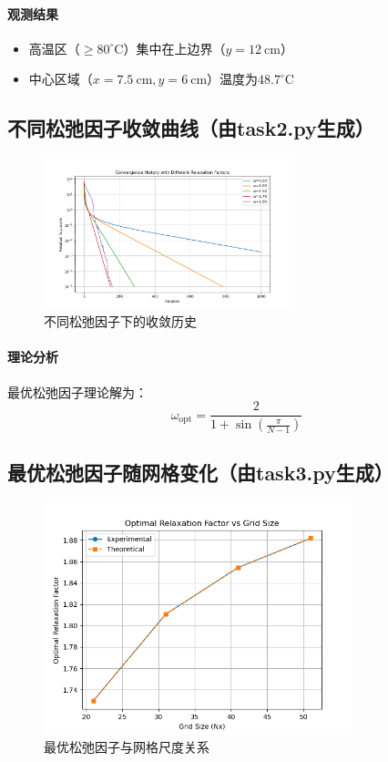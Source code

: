 \documentclass[UTF8]{ctexart}
\begin{document}
\paragraph{观测结果}
\begin{itemize}[leftmargin=2em]
    \item 高温区（$\geq80^\circ$C）集中在上边界（$y=12\ \mathrm{cm}$）
    \item 中心区域（$x=7.5\ \mathrm{cm}, y=6\ \mathrm{cm}$）温度为$48.7^\circ$C
\end{itemize}

\subsection{不同松弛因子收敛曲线（由task2.py生成）}
\begin{figure}[h]
    \centering
    \includegraphics[width=0.65\textwidth]{Figure_2.png}
    \caption{不同松弛因子下的收敛历史}
    \label{fig:converge}
\end{figure}


\paragraph{理论分析}
最优松弛因子理论解为：
\begin{equation}
    \omega_{\mathrm{opt}} = \frac{2}{1 + \sin\left(\frac{\pi}{N-1}\right)}
\end{equation}

\subsection{最优松弛因子随网格变化（由task3.py生成）}
\begin{figure}[h]
    \centering
    \includegraphics[width=0.8\textwidth]{Figure_3.png}
    \caption{最优松弛因子与网格尺度关系}
    \label{fig:omega_grid}
\end{figure}
\end{document}
